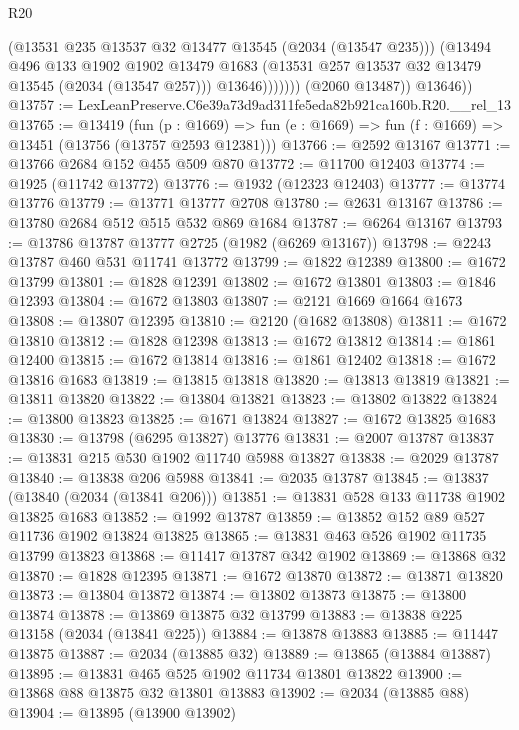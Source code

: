 \begin{lexlean}{R20}
\begin{coremodule}
                      (@13531 @235 @13537 @32 @13477 @13545 (@2034 (@13547 @235)))
                      (@13494
                        @496
                        @133
                        @1902
                        @1902
                        @13479
                        @1683
                        (@13531 @257 @13537 @32 @13479 @13545 (@2034 (@13547 @257)))
                        @13646)))))))
          (@2060 @13487))
        @13646))
@13757 := LexLeanPreserve.C6e39a73d9ad311fe5eda82b921ca160b.R20.__rel_13
@13765 := @13419
    (fun (p : @1669) => fun (e : @1669) => fun (f : @1669) => @13451 (@13756 (@13757 @2593 @12381)))
@13766 := @2592 @13167
@13771 := @13766 @2684 @152 @455 @509 @870
@13772 := @11700 @12403
@13774 := @1925 (@11742 @13772)
@13776 := @1932 (@12323 @12403)
@13777 := @13774 @13776
@13779 := @13771 @13777 @2708
@13780 := @2631 @13167
@13786 := @13780 @2684 @512 @515 @532 @869 @1684
@13787 := @6264 @13167
@13793 := @13786 @13787 @13777 @2725 (@1982 (@6269 @13167))
@13798 := @2243 @13787 @460 @531 @11741 @13772
@13799 := @1822 @12389
@13800 := @1672 @13799
@13801 := @1828 @12391
@13802 := @1672 @13801
@13803 := @1846 @12393
@13804 := @1672 @13803
@13807 := @2121 @1669 @1664 @1673
@13808 := @13807 @12395
@13810 := @2120 (@1682 @13808)
@13811 := @1672 @13810
@13812 := @1828 @12398
@13813 := @1672 @13812
@13814 := @1861 @12400
@13815 := @1672 @13814
@13816 := @1861 @12402
@13818 := @1672 @13816 @1683
@13819 := @13815 @13818
@13820 := @13813 @13819
@13821 := @13811 @13820
@13822 := @13804 @13821
@13823 := @13802 @13822
@13824 := @13800 @13823
@13825 := @1671 @13824
@13827 := @1672 @13825 @1683
@13830 := @13798 (@6295 @13827) @13776
@13831 := @2007 @13787
@13837 := @13831 @215 @530 @1902 @11740 @5988 @13827
@13838 := @2029 @13787
@13840 := @13838 @206 @5988
@13841 := @2035 @13787
@13845 := @13837 (@13840 (@2034 (@13841 @206)))
@13851 := @13831 @528 @133 @11738 @1902 @13825 @1683
@13852 := @1992 @13787
@13859 := @13852 @152 @89 @527 @11736 @1902 @13824 @13825
@13865 := @13831 @463 @526 @1902 @11735 @13799 @13823
@13868 := @11417 @13787 @342 @1902
@13869 := @13868 @32
@13870 := @1828 @12395
@13871 := @1672 @13870
@13872 := @13871 @13820
@13873 := @13804 @13872
@13874 := @13802 @13873
@13875 := @13800 @13874
@13878 := @13869 @13875 @32 @13799
@13883 := @13838 @225 @13158 (@2034 (@13841 @225))
@13884 := @13878 @13883
@13885 := @11447 @13875
@13887 := @2034 (@13885 @32)
@13889 := @13865 (@13884 @13887)
@13895 := @13831 @465 @525 @1902 @11734 @13801 @13822
@13900 := @13868 @88 @13875 @32 @13801 @13883
@13902 := @2034 (@13885 @88)
@13904 := @13895 (@13900 @13902)

\end{coremodule}
\end{lexlean}
